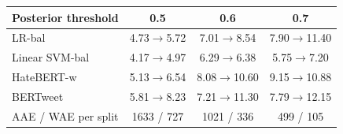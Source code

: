 \begin{tabular}{lccc}
\toprule
Posterior threshold & 0.5 & 0.6 & 0.7 \\
\midrule
LR-bal & 4.73$\to$5.72 & 7.01$\to$8.54 & 7.90$\to$11.40 \\
Linear SVM-bal & 4.17$\to$4.97 & 6.29$\to$6.38 & 5.75$\to$7.20 \\
HateBERT-w & 5.13$\to$6.54 & 8.08$\to$10.60 & 9.15$\to$10.88 \\
BERTweet & 5.81$\to$8.23 & 7.21$\to$11.30 & 7.79$\to$12.15 \\
\midrule
AAE / WAE per split & 1633 / 727 & 1021 / 336 & 499 / 105 \\
\bottomrule
\end{tabular}
